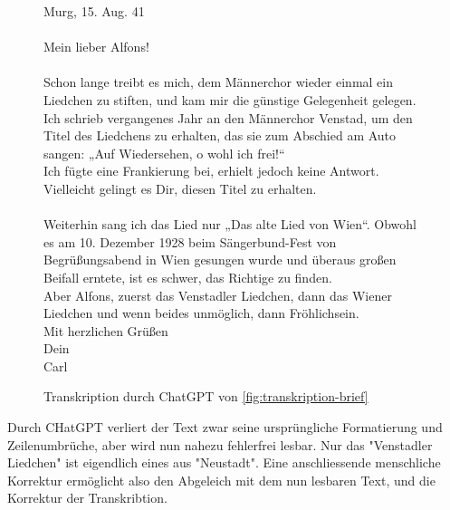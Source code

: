 \documentclass[12pt, a4paper, ngerman, bidi=default]{article}
\begin{document}
  \begin{figure}[htbp]
  \centering
    \begin{tcolorbox}[colback=oldLetter, colframe=black, sharp corners, width=\textwidth]
    Murg, 15. Aug. 41\\
    \\
Mein lieber Alfons!\\
\\
Schon lange treibt es mich, dem Männerchor wieder einmal ein Liedchen zu stiften, und kam mir die günstige Gelegenheit gelegen.\\
Ich schrieb vergangenes Jahr an den Männerchor Venstad, um den Titel des Liedchens zu erhalten, das sie zum Abschied am Auto sangen: „Auf Wiedersehen, o wohl ich frei!“\\
Ich fügte eine Frankierung bei, erhielt jedoch keine Antwort. Vielleicht gelingt es Dir, diesen Titel zu erhalten.\\
\\
Weiterhin sang ich das Lied nur „Das alte Lied von Wien“. Obwohl es am 10. Dezember 1928 beim Sängerbund-Fest von Begrüßungsabend in Wien gesungen wurde und überaus großen Beifall erntete, ist es schwer, das Richtige zu finden.\\

Aber Alfons, zuerst das Venstadler Liedchen, dann das Wiener Liedchen und wenn beides unmöglich, dann Fröhlichsein.\\

Mit herzlichen Grüßen\\
Dein\\
Carl\\
\end{tcolorbox}
\caption{Transkription durch ChatGPT von \autoref{fig:transkription-brief}}
  \label{fig:brief-carl-alfons}
\end{figure}

Durch CHatGPT verliert der Text zwar seine ursprüngliche Formatierung und Zeilenumbrüche, aber wird nun nahezu fehlerfrei lesbar. Nur das "Venstadler Liedchen" ist eigendlich eines aus "Neustadt". Eine anschliessende menschliche Korrektur ermöglicht also den Abgeleich mit dem nun lesbaren Text, und die Korrektur der Transkribtion.
\end{document}
